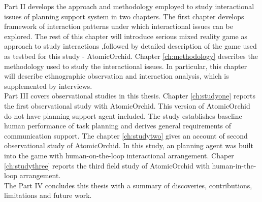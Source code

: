 Part II develops the approach and methodology employed to study interactional issues of planning support system in two chapters. The first chapter develops framework of interaction patterns under which interactional issues can be explored. The rest of this chapter will introduce serious mixed reality game as approach to study interactions  ,followed by detailed description of the game used as testbed for this study - AtomicOrchid. Chapter \ref{ch:methodology} describes the methodology used to study the interactional issues. In particular, this chapter will describe ethnographic observation and interaction analysis, which is supplemented by interviews. \\ 

Part III covers observational studies in this thesis. Chapter \ref{ch:studyone} reports the first observational study with AtomicOrchid. This version of AtomicOrchid do not have planning support agent included. The study establishes baseline human performance of task planning and derives general requirements of communication support. The chapter \ref{ch:studytwo} gives an account of second observational study of AtomicOrchid. In this study, an planning agent was built into the game with human-on-the-loop interactional arrangement. Chaper \ref{ch:studythree} reports the third field study of AtomicOrchid with human-in-the-loop arrangement. \\ 

The Part IV concludes this thesis with a summary of discoveries, contributions, limitations and future work.\\









